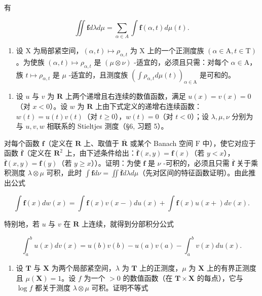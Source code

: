 有

\[
\iint \mathbf {f} d \lambda d \mu = \sum_ {\alpha \in A} \int \mathbf {f} (\alpha , t) d \mu (t).
\]

\begin{enumerate}
\def\labelenumi{\alph{enumi})}
\setcounter{enumi}{2}
\tightlist
\item
  设 X 为局部紧空间，\((\alpha,t)\mapsto\rho_{\alpha,t}\) 为 X 上的一个正测度族 \((\alpha\in\mathrm{A},t\in\mathrm{T})\)。为使族 \((\alpha,t)\mapsto\rho_{\alpha,t}\) 是 \((\mu\otimes\nu)\) -适宜的，必须且只需：对每个 \(\alpha\in\mathrm{A}\)，族 \(t\mapsto\rho_{\alpha,t}\) 是 \(\mu\) -适宜的，且测度族 \(\left(\int\rho_{\alpha,t}d\mu(t)\right)_{\alpha\in\mathrm{A}}\) 是可和的。
\end{enumerate}

\begin{enumerate}
\def\labelenumi{\arabic{enumi})}
\setcounter{enumi}{8}
\tightlist
\item
  设 \(u\) 与 \(v\) 为 \(\mathbf{R}\) 上两个递增且右连续的数值函数，满足 \(u(x) = v(x) = 0\)（对 \(x < 0\)）。设 \(w\) 为 \(\mathbf{R}\) 上由下式定义的递增右连续函数：\(w(t) = u(t)v(t)\)（对 \(t \geqslant 0\)），\(w(t) = 0\)（对 \(t < 0\)）；设 \(\lambda, \mu, \nu\) 分别为与 \(u, v, w\) 相联系的 Stieltjes 测度（§6, 习题 5）。
\end{enumerate}

对每个函数 \(\mathbf{f}\)（定义在 \(\mathbf{R}\) 上、取值于 \(\overline{\mathbf{R}}\) 或某个 Banach 空间 \(\mathrm{F}\) 中），使它对应于函数 \(\overline{\mathbf{f}}\)（定义在 \(\mathbf{R}^2\) 上，由下述条件给出：\(\overline{\mathbf{f}}(x,y) = \mathbf{f}(x)\)（若 \(y < x\)），\(\overline{\mathbf{f}}(x,y) = \mathbf{f}(y)\)（若 \(y \geqslant x\)））。证明：为使 \(\mathbf{f}\) 是 \(\nu\) -可积的，必须且只需 \(\overline{\mathbf{f}}\) 关于乘积测度 \(\lambda \otimes \mu\) 可积，此时 \(\int \mathbf{f} d\nu = \iint \overline{\mathbf{f}} d\lambda d\mu\)（先对区间的特征函数证明）。由此推出公式

\[
\int \mathbf {f} (x) d w (x) = \int \mathbf {f} (x) v (x -) d u (x) + \int \mathbf {f} (x) u (x +) d v (x).
\]

特别地，若 \(u\) 与 \(v\) 在 \(\mathbf{R}\) 上连续，就得到分部积分公式

\[
\int_ {a} ^ {b} u (x) d v (x) = u (b) v (b) - u (a) v (a) - \int_ {a} ^ {b} v (x) d u (x).
\]

\begin{enumerate}
\def\labelenumi{\arabic{enumi})}
\setcounter{enumi}{9}
\tightlist
\item
  设 \(\mathbf{T}\) 与 \(\mathbf{X}\) 为两个局部紧空间，\(\lambda\) 为 \(\mathbf{T}\) 上的正测度，\(\mu\) 为 \(\mathbf{X}\) 上的有界正测度且 \(\mu(\mathbf{X}) = 1\)。设 \(f\) 为一个 \(> 0\) 的数值函数（在 \(\mathbf{T} \times \mathbf{X}\) 的每点），它与 \(\log f\) 都关于测度 \(\lambda \otimes \mu\) 可积。证明不等式
\end{enumerate}

